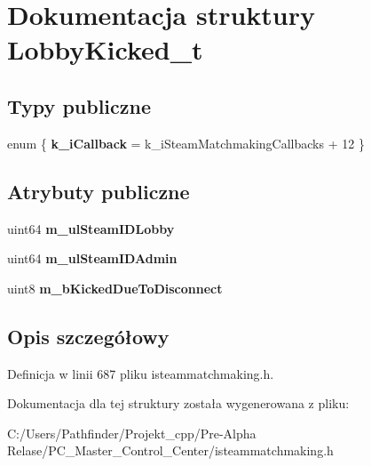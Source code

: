 \hypertarget{struct_lobby_kicked__t}{}\section{Dokumentacja struktury Lobby\+Kicked\+\_\+t}
\label{struct_lobby_kicked__t}
\subsection*{Typy publiczne}
\begin{DoxyCompactItemize}
\item 
\mbox{\label{struct_lobby_kicked__t_a91847a40c3af6a30f3b9b259cb3e86a5}} 
enum \{ {\bfseries k\+\_\+i\+Callback} = k\+\_\+i\+Steam\+Matchmaking\+Callbacks + 12
 \}
\end{DoxyCompactItemize}
\subsection*{Atrybuty publiczne}
\begin{DoxyCompactItemize}
\item 
\mbox{\label{struct_lobby_kicked__t_a09b257bf4c78c5727896272d0b85c4be}} 
uint64 {\bfseries m\+\_\+ul\+Steam\+I\+D\+Lobby}
\item 
\mbox{\label{struct_lobby_kicked__t_a870067a701ca07a834709a3cf3e1c308}} 
uint64 {\bfseries m\+\_\+ul\+Steam\+I\+D\+Admin}
\item 
\mbox{\label{struct_lobby_kicked__t_a3c55e0cc5de6f90ca6307c91e63fc78a}} 
uint8 {\bfseries m\+\_\+b\+Kicked\+Due\+To\+Disconnect}
\end{DoxyCompactItemize}


\subsection{Opis szczegółowy}


Definicja w linii 687 pliku isteammatchmaking.\+h.



Dokumentacja dla tej struktury została wygenerowana z pliku\+:\begin{DoxyCompactItemize}
\item 
C\+:/\+Users/\+Pathfinder/\+Projekt\+\_\+cpp/\+Pre-\/\+Alpha Relase/\+P\+C\+\_\+\+Master\+\_\+\+Control\+\_\+\+Center/isteammatchmaking.\+h\end{DoxyCompactItemize}
